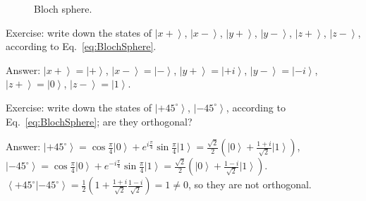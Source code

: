 \documentclass[onecolumn,pra,superscriptaddress,nofootinbib]{revtex4-1}
\newcommand{\ket}[1]{\mbox{$\left| #1 \right\rangle$}}
\newcommand{\braket}[2]{\mbox{$\left\langle #1 | #2 \right\rangle$}}
\begin{document}
\begin{figure}[tbh]
\centering {}
\caption{Bloch sphere.} \label{fig:BlochSphere}
\end{figure}

Exercise: write down the states of $\ket{x+}$, $\ket{x-}$, $\ket{y+}$, $\ket{y-}$, $\ket{z+}$, $\ket{z-}$, according to Eq.~\eqref{eq:BlochSphere}.

Answer: $\ket{x+} = \ket{+}$, $\ket{x-} = \ket{-}$, $\ket{y+} = \ket{+i}$, $\ket{y-} = \ket{-i}$, $\ket{z+} = \ket{0}$, $\ket{z-} = \ket{1}$.

Exercise: write down the states of $\ket{+45^{\circ}}$, $\ket{-45^{\circ}}$, according to Eq.~\eqref{eq:BlochSphere}; are they orthogonal?

Answer: $\ket{+45^{\circ}} = \cos\frac{\pi}{4}\ket{0}+e^{i\frac{\pi}{4}}\sin\frac{\pi}{4}\ket{1} = \frac{\sqrt{2}}{2}\left(\ket{0}+\frac{1+i}{\sqrt{2}}\ket{1}\right)$,
$\ket{-45^{\circ}} = \cos\frac{\pi}{4}\ket{0}+e^{-i\frac{\pi}{4}}\sin\frac{\pi}{4}\ket{1} = \frac{\sqrt{2}}{2}\left(\ket{0}+\frac{1-i}{\sqrt{2}}\ket{1}\right)$.
$\braket{+45^{\circ}}{-45^{\circ}} = \frac{1}{2}\left(1+\frac{1+i}{\sqrt{2}}\frac{1-i}{\sqrt{2}}\right)=1\neq0$, so they are not orthogonal.
\end{document}
